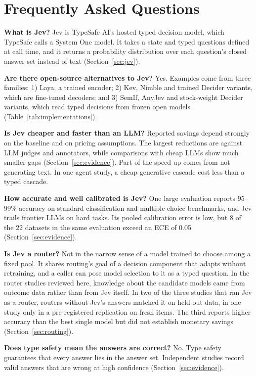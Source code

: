 \section{Frequently Asked Questions}
\label{sec:faq}

\noindent\textbf{What is Jev?} Jev is TypeSafe AI's hosted typed decision model, which TypeSafe calls a System One model. It takes a state and typed questions defined at call time, and it returns a probability distribution over each question's closed answer set instead of text (Section~\ref{sec:jev}).

\noindent\textbf{Are there open-source alternatives to Jev?} Yes. Examples come from three families: 1) Laya, a trained encoder; 2) Kev, Nimble and trained Decider variants, which are fine-tuned decoders; and 3) SemIf, AnyJev and stock-weight Decider variants, which read typed decisions from frozen open models (Table~\ref{tab:implementations}).

\noindent\textbf{Is Jev cheaper and faster than an LLM?} Reported savings depend strongly on the baseline and on pricing assumptions. The largest reductions are against LLM judges and annotators, while comparisons with cheap LLMs show much smaller gaps (Section~\ref{sec:evidence}). Part of the speed-up comes from not generating text. In one agent study, a cheap generative cascade cost less than a typed cascade.

\noindent\textbf{How accurate and well calibrated is Jev?} One large evaluation reports 95--99\% accuracy on standard classification and multiple-choice benchmarks, and Jev trails frontier LLMs on hard tasks. Its pooled calibration error is low, but 8 of the 22 datasets in the same evaluation exceed an ECE of 0.05 (Section~\ref{sec:evidence}).

\noindent\textbf{Is Jev a router?} Not in the narrow sense of a model trained to choose among a fixed pool. It shares routing's goal of a decision component that adapts without retraining, and a caller can pose model selection to it as a typed question. In the router studies reviewed here, knowledge about the candidate models came from outcome data rather than from Jev itself. In two of the three studies that ran Jev as a router, routers without Jev's answers matched it on held-out data, in one study only in a pre-registered replication on fresh items. The third reports higher accuracy than the best single model but did not establish monetary savings (Section~\ref{sec:routing}).

\noindent\textbf{Does type safety mean the answers are correct?} No. Type safety guarantees that every answer lies in the answer set. Independent studies record valid answers that are wrong at high confidence (Section~\ref{sec:evidence}).

